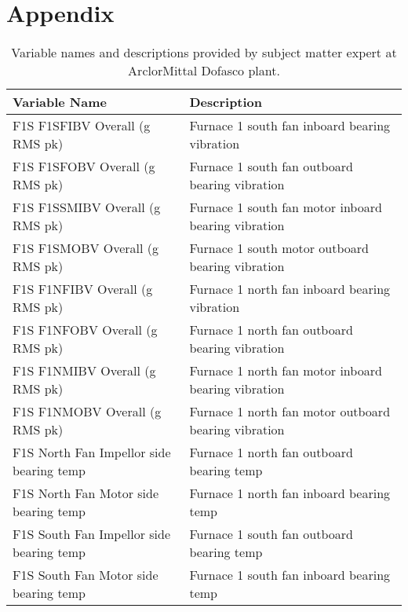 \section*{Appendix}

\begin{table}[!h]
    \begin{tabular}{ll}
    \textbf{Variable Name}                   & \textbf{Description }                                   \\ \hline
    F1S F1SFIBV Overall (g RMS pk)           & Furnace 1 south fan inboard bearing vibration        \\
    F1S F1SFOBV Overall (g RMS pk)           & Furnace 1 south fan outboard bearing vibration       \\
    F1S F1SSMIBV Overall (g RMS pk)          & Furnace 1 south fan motor inboard bearing vibration  \\
    F1S F1SMOBV Overall (g RMS pk)           & Furnace 1 south motor outboard bearing vibration     \\
    F1S F1NFIBV Overall (g RMS pk)           & Furnace 1 north fan inboard bearing vibration        \\
    F1S F1NFOBV Overall (g RMS pk)           & Furnace 1 north fan outboard bearing vibration       \\
    F1S F1NMIBV Overall (g RMS pk)           & Furnace 1 north fan motor inboard bearing vibration  \\
    F1S F1NMOBV Overall (g RMS pk)           & Furnace 1 north fan motor outboard bearing vibration \\
    F1S North Fan Impellor side bearing temp & Furnace 1 north fan outboard bearing temp            \\
    F1S North Fan Motor side bearing temp    & Furnace 1 north fan inboard bearing temp             \\
    F1S South Fan Impellor side bearing temp & Furnace 1 south fan outboard bearing temp            \\
    F1S South Fan Motor side bearing temp    & Furnace 1 south fan inboard bearing temp            
    \end{tabular}
    \label{tbl:var}
    \caption{Variable names and descriptions provided by subject matter expert at ArclorMittal Dofasco plant.}
\end{table}
